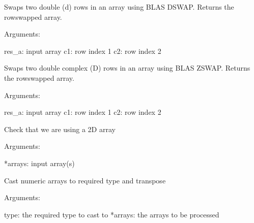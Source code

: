 \documentclass[a4paper,11pt,english]{sphinxmanual}
\begin{document}
\begin{fulllineitems}
\begin{fulllineitems}
\end{fulllineitems}


\begin{fulllineitems}
\label{modules_doc:cbmpy.PyscesStoich.MathArrayFunc.SwapRowd}
Swaps two double (d) rows in an array using BLAS DSWAP. Returns the rowswapped array.

Arguments:

res\_a: input array
c1: row index 1
c2: row index 2

\end{fulllineitems}


\begin{fulllineitems}
\label{modules_doc:cbmpy.PyscesStoich.MathArrayFunc.SwapRowz}
Swaps two double complex (D) rows in an array using BLAS ZSWAP. Returns the rowswapped array.

Arguments:

res\_a: input array
c1: row index 1
c2: row index 2

\end{fulllineitems}


\begin{fulllineitems}
\label{modules_doc:cbmpy.PyscesStoich.MathArrayFunc.assertRank2}
Check that we are using a 2D array

Arguments:

*arrays: input array(s)

\end{fulllineitems}


\begin{fulllineitems}
\label{modules_doc:cbmpy.PyscesStoich.MathArrayFunc.castCopyAndTranspose}
Cast numeric arrays to required type and transpose

Arguments:

type: the required type to cast to
*arrays: the arrays to be processed


\end{fulllineitems}
\end{fulllineitems}
\end{document}
